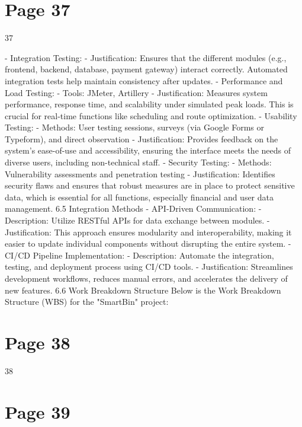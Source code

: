 \documentclass{article}
\begin{document}
\section*{Page 37}
   
 
 37  
 
- Integration Testing:   
  - Justification: Ensures that the different modules (e.g., frontend, backend, database, payment 
gateway) interact correctly. Automated integration tests help maintain consistency after 
updates. 
- Performance and Load Testing:   
  - Tools: JMeter, Artillery   
  - Justification: Measures system performance, response time, and scalability under simulated 
peak loads. This is crucial for real-time functions like scheduling and route optimization. 
- Usability Testing:   
  - Methods: User testing sessions, surveys (via Google Forms or Typeform), and direct 
observation   
  - Justification: Provides feedback on the system’s ease-of-use and accessibility, ensuring the 
interface meets the needs of diverse users, including non-technical staff. 
- Security Testing:   
  - Methods: Vulnerability assessments and penetration testing   
  - Justification: Identifies security flaws and ensures that robust measures are in place to 
protect sensitive data, which is essential for all functions, especially financial and user data 
management. 
 6.5 Integration Methods 
- API-Driven Communication:   
  - Description: Utilize RESTful APIs for data exchange between modules.   
  - Justification: This approach ensures modularity and interoperability, making it easier to 
update individual components without disrupting the entire system. 
- CI/CD Pipeline Implementation:   
  - Description: Automate the integration, testing, and deployment process using CI/CD tools.   
  - Justification: Streamlines development workflows, reduces manual errors, and accelerates 
the delivery of new features. 
6.6 Work Breakdown Structure  
Below is the Work Breakdown Structure (WBS) for the "SmartBin" project: 

\section*{Page 38}
   
 
 38  
 
 
 
 


\section*{Page 39}
   
\end{document}
